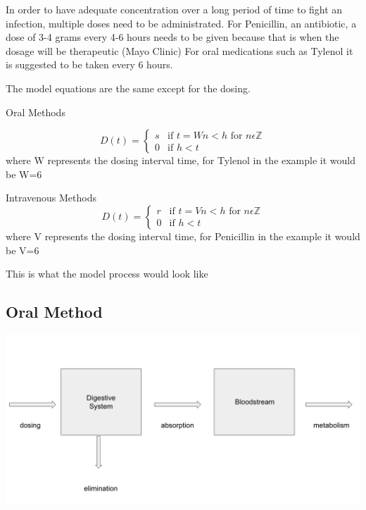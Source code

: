 \documentclass{article}
\begin{document}
In order to have adequate concentration over a long period of time to fight an infection, multiple doses need to be administrated. For Penicillin, an antibiotic, a dose of 3-4 grams every 4-6 hours needs to be given because that is when the dosage will be therapeutic (Mayo Clinic) For oral medications such as Tylenol it is suggested to be taken every 6 hours. 

The model equations are the same except for the dosing. 

Oral Methods 

\begin{equation}
  D(t) =
    \begin{cases}
      s & \text{if  $t = Wn <h$ for $n\epsilon \mathbb{Z}$}\\
      0 & \text{if $h< t$}
    \end{cases}       
\end{equation}
where W represents the dosing interval time, for Tylenol in the example it would be W=6

Intravenous Methods
\begin{equation}
  D(t) =
    \begin{cases}
      r & \text{if  $t = Vn <h$ for $n\epsilon \mathbb{Z}$}\\
      0 & \text{if $h< t$}
    \end{cases}       
\end{equation}
where V represents the dosing interval time, for Penicillin in the example it would be V=6



This is what the model process would look like

\subsection*{Oral Method}

\begin{center}
    \includegraphics[scale = 0.4]{oral method graph .png}
\end{center}
\end{document}
